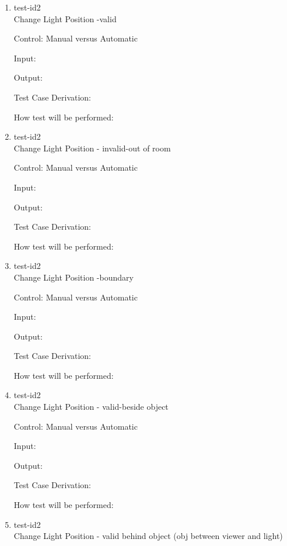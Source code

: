 \documentclass[12pt, titlepage]{article}
\begin{document}
\begin{enumerate}
	
	\item{test-id2\\}Change Light Position -valid
	
	Control: Manual versus Automatic
	
	Input: 
	
	Output: 
	
	Test Case Derivation: 
	
	How test will be performed: 
	
	\item{test-id2\\}Change Light Position - invalid-out of room
	
	Control: Manual versus Automatic
	
	Input: 
	
	Output: 
	
	Test Case Derivation: 
	
	How test will be performed: 
	
	\item{test-id2\\}Change Light Position -boundary
	
	Control: Manual versus Automatic
	
	Input: 
	
	Output: 
	
	Test Case Derivation: 
	
	How test will be performed: 
	
	\item{test-id2\\}Change Light Position - valid-beside object
	
	Control: Manual versus Automatic
	
	Input: 
	
	Output: 
	
	Test Case Derivation: 
	
	How test will be performed: 
	
	\item{test-id2\\}Change Light Position - valid behind object (obj between 
	viewer and light)
	

\end{enumerate}
\end{document}
